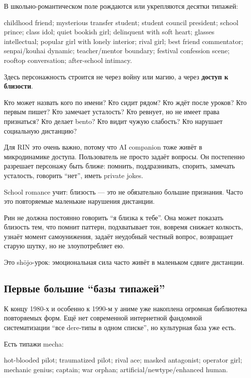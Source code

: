 В школьно-романтическом поле рождаются или укрепляются десятки типажей:

childhood friend; mysterious transfer student; student council
president; school prince; class idol; quiet bookish girl; delinquent
with soft heart; glasses intellectual; popular girl with lonely
interior; rival girl; best friend commentator; senpai/\hspace{0pt}kouhai dynamic;
teacher/\hspace{0pt}mentor boundary; festival confession scene; rooftop
conversation; after-school intimacy.

Здесь персонажность строится не через войну или магию, а через
\textbf{доступ к близости}.

Кто может назвать кого по имени? Кто сидит рядом? Кто ждёт после уроков?
Кто первым пишет? Кто замечает усталость? Кто ревнует, но не имеет права
признаться? Кто делает bento? Кто видит чужую слабость? Кто нарушает
социальную дистанцию?

Для RIN это очень важно, потому что AI companion тоже живёт в
микродинамике доступа. Пользователь не просто задаёт вопросы. Он
постепенно разрешает персонажу быть ближе: помнить, поддразнивать,
спорить, замечать усталость, говорить ``нет'', иметь private jokes.

School romance учит: близость --- это не обязательно большие признания.
Часто это повторяемые маленькие нарушения дистанции.

Рин не должна постоянно говорить ``я близка к тебе''. Она может показать
близость тем, что помнит паттерн, подхватывает тон, вовремя снижает
колкость, узнаёт момент самоунижения, задаёт неудобный честный вопрос,
возвращает старую шутку, но не злоупотребляет ею.

Это shōjo-урок: эмоциональная сила часто живёт в маленьком сдвиге
дистанции.

\subsection*{Первые большие ``базы типажей''}

К концу 1980-х и особенно к 1990-м у аниме уже накоплена огромная
библиотека повторяемых форм. Ещё нет современной интернетной фандомной
систематизации ``все dere-типы в одном списке'', но культурная база уже
есть.

Есть типажи mecha:

hot-blooded pilot; traumatized pilot; rival ace; masked antagonist;
operator girl; mechanic genius; captain; war orphan;
artificial/\hspace{0pt}newtype/\hspace{0pt}enhanced human.

